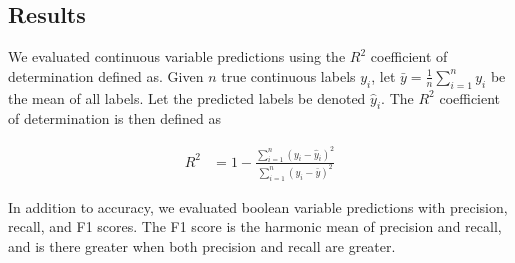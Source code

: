 \documentclass{article} %
\begin{document}

\subsection{Results}
\label{sec:results}

We evaluated continuous variable predictions using the $R^2$ coefficient of determination defined as. Given $n$ true continuous labels $y_i$, let $\bar{y} = \frac{1}{n}\sum_{i=1}^n y_i$ be the mean of all labels. Let the predicted labels be denoted $\hat{y}_i$. The $R^2$ coefficient of determination is then defined as

\begin{align*}
  R^2 &= 1 - \frac{\sum_{i=1}^n (y_i - \hat{y}_i)^2}{\sum_{i=1}^n (y_i - \bar{y})^2}
\end{align*}

In addition to accuracy, we evaluated boolean variable predictions with precision, recall, and F1 scores. The F1 score is the harmonic mean of precision and recall, and is there greater when both precision and recall are greater.
\end{document}
